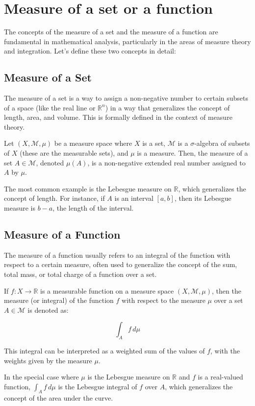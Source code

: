 \documentclass[a4paper,12pt]{article} %
\begin{document}
\newpage
\section{\textbf{Measure of a set or a function}}
The concepts of the measure of a set and the measure of a function are fundamental in mathematical analysis, particularly in the areas of measure theory and integration. Let's define these two concepts in detail:

\subsection{Measure of a Set}

The measure of a set is a way to assign a non-negative number to certain subsets of a space (like the real line or $\mathbb{R}^n$) in a way that generalizes the concept of length, area, and volume. This is formally defined in the context of measure theory.

Let $(X, \mathcal{M}, \mu)$ be a measure space where $X$ is a set, $\mathcal{M}$ is a $\sigma$-algebra of subsets of $X$ (these are the measurable sets), and $\mu$ is a measure. Then, the measure of a set $A \in \mathcal{M}$, denoted $\mu(A)$, is a non-negative extended real number assigned to $A$ by $\mu$.

The most common example is the Lebesgue measure on $\mathbb{R}$, which generalizes the concept of length. For instance, if $A$ is an interval $[a, b]$, then its Lebesgue measure is $b - a$, the length of the interval.

\subsection{Measure of a Function} 

The measure of a function usually refers to an integral of the function with respect to a certain measure, often used to generalize the concept of the sum, total mass, or total charge of a function over a set.

If $f: X \to \mathbb{R}$ is a measurable function on a measure space $(X, \mathcal{M}, \mu)$, then the measure (or integral) of the function $f$ with respect to the measure $\mu$ over a set $A \in \mathcal{M}$ is denoted as:

\[
\int_A f \, d\mu
\]

This integral can be interpreted as a weighted sum of the values of $f$, with the weights given by the measure $\mu$.

In the special case where $\mu$ is the Lebesgue measure on $\mathbb{R}$ and $f$ is a real-valued function, $\int_A f \, d\mu$ is the Lebesgue integral of $f$ over $A$, which generalizes the concept of the area under the curve.
\end{document}
